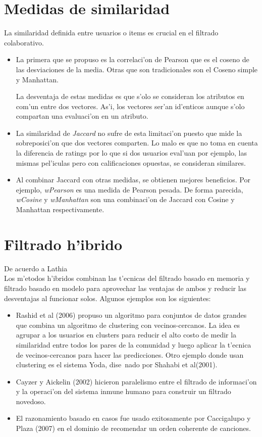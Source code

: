 \documentclass[11pt]{article}
\begin{document}
\section{Medidas de similaridad}

La similaridad definida entre usuarios o items es crucial en el filtrado colaborativo.

\begin{itemize}
\item La primera que se propuso es la correlaci'on de Pearson que es el coseno de las desviaciones de la media. Otras que son tradicionales son el Coseno simple y Manhattan.

La desventaja de estas medidas es que s'olo se consideran los atributos en com'un entre dos vectores. As'i, los vectores ser'an id'enticos aunque s'olo compartan una evaluaci'on en un atributo.
\item La similaridad de \textit{Jaccard} no sufre de esta limitaci'on puesto que mide la sobreposici'on que dos vectores comparten. Lo malo es que no toma en cuenta la diferencia de ratings por lo que si dos usuarios eval'uan por ejemplo, las mismas pel'iculas pero con calificaciones opuestas, se consideran similares.
\item Al combinar Jaccard con otras medidas, se obtienen mejores beneficios. Por ejemplo, \textit{wPearson} es una medida de Pearson pesada. De forma parecida, \textit{wCosine} y \textit{wManhattan} son una combinaci'on de Jaccard con Cosine y Manhattan respectivamente.
\end{itemize}



\section{Filtrado h'ibrido}

De acuerdo a Lathia~\cite{recsys:nlathia}\\
Los m'etodos h'ibridos combinan las t'ecnicas del filtrado basado en memoria y filtrado basado en modelo para aprovechar las ventajas de ambos y reducir las desventajas al funcionar solos. Algunos ejemplos son los siguientes:

\begin{itemize}
\item Rashid et al (2006) propuso un algoritmo para conjuntos de datos grandes que combina un algoritmo de clustering con vecinos-cercanos. La idea es agrupar a los usuarios en clusters para reducir el alto costo de medir la similaridad entre todos los pares de la comunidad y luego aplicar la t'ecnica de vecinos-cercanos para hacer las predicciones. Otro ejemplo donde usan clustering es el sistema Yoda, dise~nado por Shahabi et al(2001).
\item Cayzer y Aickelin (2002) hicieron paralelismo entre el filtrado de informaci'on y la operaci'on del sistema inmune humano para construir un filtrado novedoso.
\item El razonamiento basado en casos fue usado exitosamente por Caccigalupo y Plaza (2007) en el dominio de recomendar un orden coherente de canciones.
\end{itemize}
\end{document}
